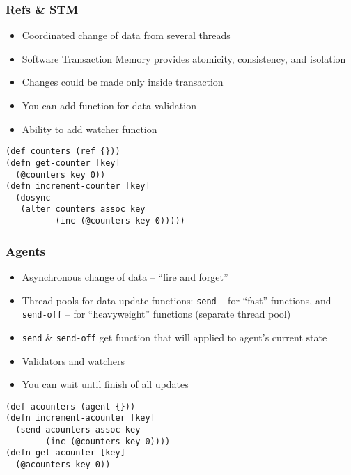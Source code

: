 \begin{frame}[fragile,t]
  \frametitle{Refs \& STM}
  \begin{itemize}
  \item Coordinated change of data from several threads
  \item Software Transaction Memory provides atomicity, consistency, and isolation
  \item Changes could be made only inside transaction
  \item You can add function for data validation
  \item Ability to add watcher function
  \end{itemize}
\begin{lstlisting}
(def counters (ref {}))
(defn get-counter [key]
  (@counters key 0))
(defn increment-counter [key]
  (dosync
   (alter counters assoc key 
          (inc (@counters key 0)))))
\end{lstlisting}
\end{frame}

\begin{frame}[fragile,t]
  \frametitle{Agents}
  \begin{itemize}
  \item Asynchronous change of data -- ``fire and forget''
  \item Thread pools for data update functions: \texttt{send} -- for
    ``fast'' functions, and \texttt{send-off} -- for ``heavyweight'' functions
    (separate thread pool)
  \item \texttt{send} \& \texttt{send-off} get function that will applied to agent's
    current state
  \item Validators and watchers
  \item You can wait until finish of all updates
  \end{itemize}
\begin{lstlisting}
(def acounters (agent {}))
(defn increment-acounter [key]
  (send acounters assoc key 
        (inc (@counters key 0))))
(defn get-acounter [key]
  (@acounters key 0))
\end{lstlisting}
\end{frame}

